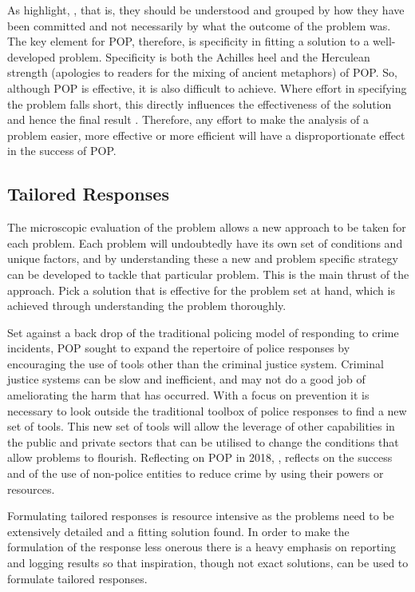 As \textcite{felson1998opportunity} highlight, , that is, they should be understood and grouped by how they have been committed and not necessarily by what the outcome of the problem was. The key element for POP, therefore, is specificity in fitting a solution to a well-developed problem. Specificity is both the Achilles heel and the Herculean strength (apologies to readers for the mixing of ancient metaphors) of POP. So, although POP is effective, it is also difficult to achieve. Where effort in specifying the problem falls short, this directly influences the effectiveness of the solution and hence the final result \parencite{maguire2015problem}. Therefore, any effort to make the analysis of a problem easier, more effective or more efficient will have a disproportionate effect in the success of POP.


\subsection{Tailored Responses} 
 
The microscopic evaluation of the problem allows a new approach to be taken for each problem. Each problem will undoubtedly have its own set of conditions and unique factors, and by understanding these a new and problem specific strategy can be developed to tackle that particular problem. This is the main thrust of the approach. Pick a solution that is effective for the problem set at hand, which is achieved through understanding the problem thoroughly.

 Set against a back drop of the traditional policing model of responding to crime incidents, POP sought to expand the repertoire of police responses by encouraging the use of tools other than the criminal justice system. Criminal justice systems can be slow and inefficient, and may not do a good job of ameliorating the harm that has occurred.  With a focus on prevention it is necessary to look outside the traditional toolbox of police responses to find a new set of tools. This new set of tools will allow the leverage of other capabilities in the public and private sectors that can be utilised to change the conditions that allow problems to flourish. Reflecting on POP in 2018, \textcite{stockholmlec}, reflects on the success and  of the use of non-police entities to reduce crime by using their powers or resources. 
 
Formulating tailored responses is resource intensive as the problems need to be extensively detailed and a fitting solution found. In order to make the formulation of the response less onerous there is a heavy emphasis on reporting and logging results so that inspiration, though not exact solutions, can be used to formulate tailored responses. 
 
